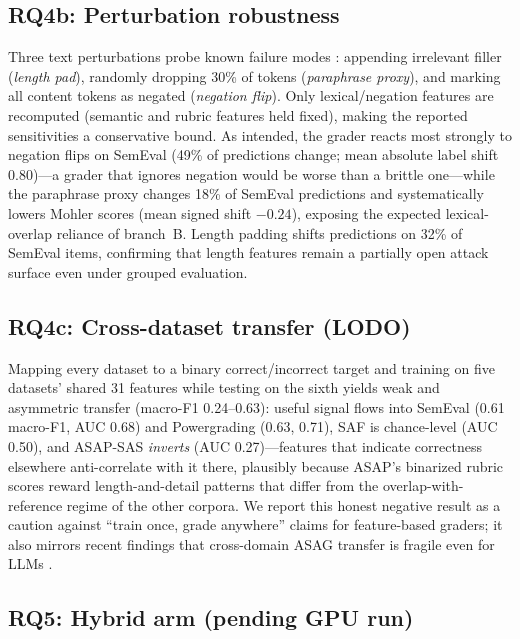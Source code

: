 \documentclass[11pt]{article}
\begin{document}
\subsection{RQ4b: Perturbation robustness}
Three text perturbations probe known failure modes
\cite{filighera2020fooling,ding2020dont}: appending irrelevant filler
(\emph{length pad}), randomly dropping 30\% of tokens (\emph{paraphrase
proxy}), and marking all content tokens as negated (\emph{negation flip}).
Only lexical/negation features are recomputed (semantic and rubric features
held fixed), making the reported sensitivities a conservative bound. As
intended, the grader reacts most strongly to negation flips on SemEval (49\% of
predictions change; mean absolute label shift 0.80)---a grader that ignores
negation would be worse than a brittle one---while the paraphrase proxy changes
18\% of SemEval predictions and systematically lowers Mohler scores (mean
signed shift $-0.24$), exposing the expected lexical-overlap reliance of
branch~B. Length padding shifts predictions on 32\% of SemEval items,
confirming that length features remain a partially open attack surface even
under grouped evaluation.

\subsection{RQ4c: Cross-dataset transfer (LODO)}
\label{sec:results-lodo}

Mapping every dataset to a binary correct/incorrect target and training on
five datasets' shared 31 features while testing on the sixth yields weak and
asymmetric transfer (macro-F1 0.24--0.63): useful signal flows into SemEval
(0.61 macro-F1, AUC 0.68) and Powergrading (0.63, 0.71), SAF is chance-level
(AUC 0.50), and ASAP-SAS \emph{inverts} (AUC 0.27)---features that indicate
correctness elsewhere anti-correlate with it there, plausibly because ASAP's
binarized rubric scores reward length-and-detail patterns that differ from the
overlap-with-reference regime of the other corpora. We report this honest
negative result as a caution against ``train once, grade anywhere'' claims for
feature-based graders; it also mirrors recent findings that cross-domain ASAG
transfer is fragile even for LLMs \cite{meyer2024asag2024}.

\subsection{RQ5: Hybrid arm (pending GPU run)}
\label{sec:results-hybrid}
\end{document}
